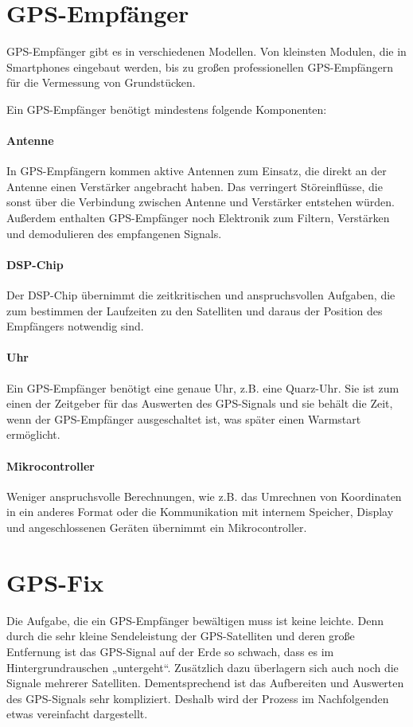\documentclass[12pt,a4paper]{scrartcl}
\begin{document}
\section{GPS-Empfänger}
GPS-Empfänger gibt es in verschiedenen Modellen. Von kleinsten Modulen, die in Smartphones eingebaut werden, bis zu großen professionellen GPS-Empfängern für die Vermessung von Grundstücken.

Ein GPS-Empfänger benötigt mindestens folgende Komponenten:

\paragraph{Antenne}
In GPS-Empfängern kommen aktive Antennen zum Einsatz, die direkt an der Antenne einen Verstärker angebracht haben. Das verringert Störeinflüsse, die sonst über die Verbindung zwischen Antenne und Verstärker entstehen würden. Außerdem enthalten GPS-Empfänger noch Elektronik zum Filtern, Verstärken und demodulieren des empfangenen Signals.

\paragraph{DSP-Chip}
Der DSP-Chip übernimmt die zeitkritischen und anspruchsvollen Aufgaben, die zum bestimmen der Laufzeiten zu den Satelliten und daraus der Position des Empfängers notwendig sind.

\paragraph{Uhr}
Ein GPS-Empfänger benötigt eine genaue Uhr, z.B. eine Quarz-Uhr. Sie ist zum einen der Zeitgeber für das Auswerten des GPS-Signals und sie behält die Zeit, wenn der GPS-Empfänger ausgeschaltet ist, was später einen Warmstart ermöglicht.

\paragraph{Mikrocontroller}
Weniger anspruchsvolle Berechnungen, wie z.B. das Umrechnen von Koordinaten in ein anderes Format oder die Kommunikation mit internem Speicher, Display und angeschlossenen Geräten übernimmt ein Mikrocontroller.

\section{GPS-Fix}
Die Aufgabe, die ein GPS-Empfänger bewältigen muss ist keine leichte.
Denn durch die sehr kleine Sendeleistung der GPS-Satelliten und deren große Entfernung ist das GPS-Signal auf der Erde so schwach, dass es im Hintergrundrauschen „untergeht“. Zusätzlich dazu überlagern sich auch noch die Signale mehrerer Satelliten. Dementsprechend ist das Aufbereiten und Auswerten des GPS-Signals sehr kompliziert. Deshalb wird der Prozess im Nachfolgenden etwas vereinfacht dargestellt.
\end{document}

